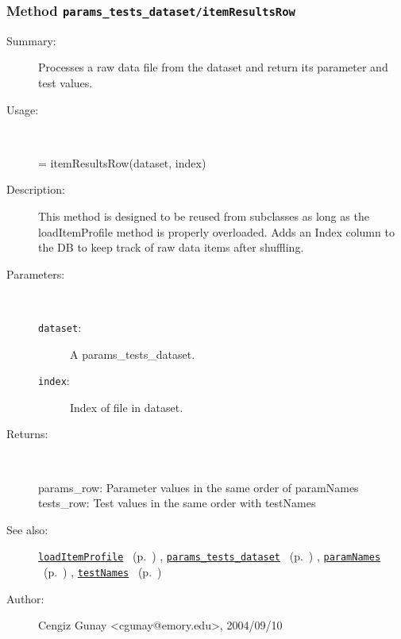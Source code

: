 \subsubsection[Method \texttt{itemResultsRow}]{Method \texttt{params\_tests\_dataset/itemResultsRow}}%
%
\label{ref_params_tests_dataset__itemResultsRow}%
\hypertarget{ref_params_tests_dataset__itemResultsRow}{}%
\begin{description}
\item[Summary:]Processes a raw data file from the dataset and return
		its parameter and test values.
%
\item[Usage:]~%
\begin{lyxcode}%
[params\_row, tests\_row] = itemResultsRow(dataset, index)
%
\end{lyxcode}%
%
\item[Description:]%
This method is designed to be reused from subclasses as long as the
 loadItemProfile method is properly overloaded. Adds an Index
 column to the DB to keep track of raw data items after shuffling.
\item[Parameters:]~
\begin{description}%
\item[\texttt{dataset}:]
 A params\_tests\_dataset.
\item[\texttt{index}:]
 Index of file in dataset.
\end{description}%
%
\item[Returns:]~

	params\_row: Parameter values in the same order of paramNames
	tests\_row: Test values in the same order with testNames
%
%
\item[See also:]%
\hyperlink{ref_loadItemProfile}{\texttt{loadItemProfile}}%
\ (p.~\pageref{ref_loadItemProfile})%
%
, \hyperlink{ref_params_tests_dataset}{\texttt{params\_tests\_dataset}}%
\ (p.~\pageref{ref_params_tests_dataset})%
%
, \hyperlink{ref_paramNames}{\texttt{paramNames}}%
\ (p.~\pageref{ref_paramNames})%
%
, \hyperlink{ref_testNames}{\texttt{testNames}}%
\ (p.~\pageref{ref_testNames})%
%
%
\item[Author:]%
Cengiz Gunay <cgunay@emory.edu>, 2004/09/10%
\end{description}
\methodline%
